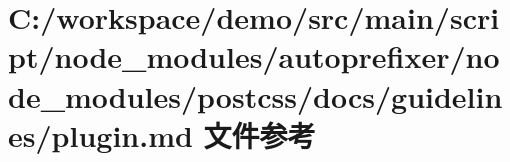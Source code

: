 \hypertarget{autoprefixer_2node__modules_2postcss_2docs_2guidelines_2plugin_8md}{}\section{C\+:/workspace/demo/src/main/script/node\+\_\+modules/autoprefixer/node\+\_\+modules/postcss/docs/guidelines/plugin.md 文件参考}
\label{autoprefixer_2node__modules_2postcss_2docs_2guidelines_2plugin_8md}
